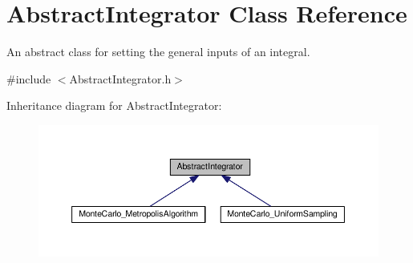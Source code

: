 \hypertarget{class_abstract_integrator}{}\section{Abstract\+Integrator Class Reference}
\label{class_abstract_integrator}


An abstract class for setting the general inputs of an integral.  




{\ttfamily \#include $<$Abstract\+Integrator.\+h$>$}



Inheritance diagram for Abstract\+Integrator\+:
\nopagebreak
\begin{figure}[H]
\begin{center}
\leavevmode
\includegraphics[width=350pt]{class_abstract_integrator__inherit__graph}
\end{center}
\end{figure}
